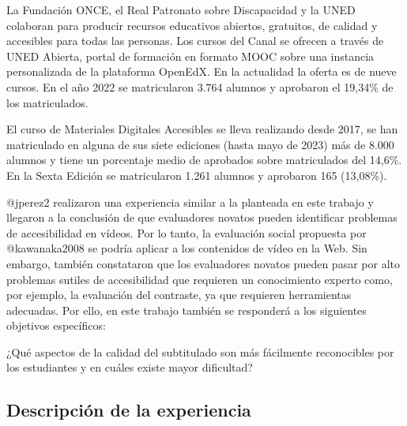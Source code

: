 \documentclass[
  letterpaper,
  DIV=11,
  numbers=noendperiod]{scrartcl}
\begin{document}
La Fundación ONCE, el Real Patronato sobre Discapacidad y la UNED
colaboran para producir recursos educativos abiertos, gratuitos, de
calidad y accesibles para todas las personas. Los cursos del Canal se
ofrecen a través de UNED Abierta, portal de formación en formato MOOC
sobre una instancia personalizada de la plataforma OpenEdX. En la
actualidad la oferta es de nueve cursos. En el año 2022 se matricularon
3.764 alumnos y aprobaron el 19,34\% de los matriculados.

El curso de Materiales Digitales Accesibles se lleva realizando desde
2017, se han matriculado en alguna de sus siete ediciones (hasta mayo de
2023) más de 8.000 alumnos y tiene un porcentaje medio de aprobados
sobre matriculados del 14,6\%. En la Sexta Edición se matricularon 1.261
alumnos y aprobaron 165 (13,08\%).

@jperez2 realizaron una experiencia similar a la planteada en este
trabajo y llegaron a la conclusión de que evaluadores novatos pueden
identificar problemas de accesibilidad en vídeos. Por lo tanto, la
evaluación social propuesta por @kawanaka2008 se podría aplicar a los
contenidos de vídeo en la Web. Sin embargo, también constataron que los
evaluadores novatos pueden pasar por alto problemas sutiles de
accesibilidad que requieren un conocimiento experto como, por ejemplo,
la evaluación del contraste, ya que requieren herramientas adecuadas.
Por ello, en este trabajo también se responderá a los siguientes
objetivos específicos:

\begin{tcolorbox}[enhanced jigsaw, leftrule=.75mm, bottomtitle=1mm, toprule=.15mm, opacityback=0, bottomrule=.15mm, colframe=quarto-callout-tip-color-frame, titlerule=0mm, colbacktitle=quarto-callout-tip-color!10!white, arc=.35mm, breakable, toptitle=1mm, left=2mm, colback=white, coltitle=black, title=\textcolor{quarto-callout-tip-color}{\faLightbulb}\hspace{0.5em}{Objetivos específicos}, rightrule=.15mm, opacitybacktitle=0.6]

¿Qué aspectos de la calidad del subtitulado son más fácilmente
reconocibles por los estudiantes y en cuáles existe mayor dificultad?

\end{tcolorbox}

\hypertarget{descripciuxf3n-de-la-experiencia}{%
\subsection{Descripción de la
experiencia}\label{descripciuxf3n-de-la-experiencia}}
\end{document}
